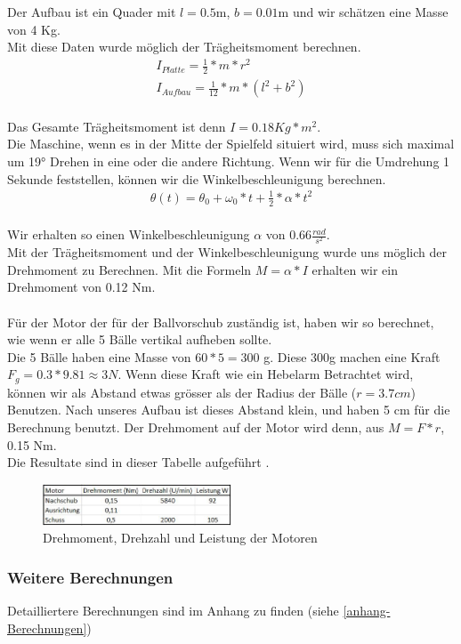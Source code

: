 Der Aufbau ist ein Quader mit $l=0.5$m, $b=0.01$m und wir schätzen eine Masse von 4 Kg.\\
Mit diese Daten wurde möglich der Trägheitsmoment berechnen.\\
\begin{gather}
	I_{Platte}=\frac{1}{2}*m*r^2 \\
	I_{Aufbau}=\frac{1}{12}*m*(l^2+b^2)
\end{gather}\\
Das Gesamte Trägheitsmoment ist denn $I=0.18 Kg*m^2$.\\
Die Maschine, wenn es in der Mitte der Spielfeld situiert wird, muss sich maximal um 19° Drehen in eine oder die andere Richtung. Wenn wir für die Umdrehung 1 Sekunde feststellen, können wir die Winkelbeschleunigung berechnen. \\
\begin{gather}
	\theta(t)=\theta_0+\omega_0*t+\frac{1}{2}*\alpha*t^2
\end{gather}\\
Wir erhalten so einen Winkelbeschleunigung $\alpha$ von 0.66$\frac{rad}{s^2}$.\\
Mit der Trägheitsmoment und der Winkelbeschleunigung wurde uns möglich der Drehmoment zu Berechnen.
Mit die Formeln $M=\alpha*I$ erhalten wir ein Drehmoment von 0.12 Nm.\\ \\
Für der Motor der für der Ballvorschub zuständig ist, haben wir so berechnet, wie wenn er alle 5 Bälle vertikal aufheben sollte.\\
Die 5 Bälle haben eine Masse von $60*5=300$ g. Diese 300g machen eine Kraft $F_g=0.3*9.81\approx3 N$. Wenn diese Kraft wie ein Hebelarm Betrachtet wird, können wir als Abstand etwas grösser als der Radius der Bälle ($r=3.7cm$) Benutzen. Nach unseres Aufbau ist dieses Abstand klein, und haben 5 cm für die Berechnung benutzt. Der Drehmoment auf der Motor wird denn, aus $M=F*r$, 0.15 Nm.\\
Die Resultate sind in dieser Tabelle aufgeführt .\\
\begin{figure}[h!]
	\center
	\includegraphics[width=0.5\textwidth]{../../fig/Tabelle_Drehmomente.jpg}
	\caption{Drehmoment, Drehzahl und Leistung der Motoren}
	\label{fig:Drehmoment}
\end{figure} 
\newpage


\subsubsection{Weitere Berechnungen}
Detailliertere Berechnungen sind im Anhang zu finden (siehe \ref{anhang-Berechnungen})
